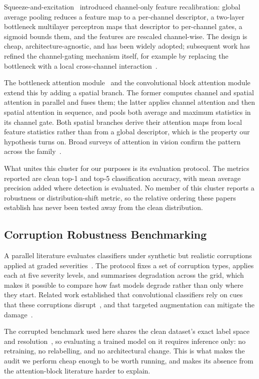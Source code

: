 Squeeze-and-excitation~\cite{hu2018squeeze} introduced channel-only feature
recalibration: global average pooling reduces a feature map to a per-channel
descriptor, a two-layer bottleneck multilayer perceptron maps that descriptor
to per-channel gates, a sigmoid bounds them, and the features are rescaled
channel-wise. The design is cheap, architecture-agnostic, and has been widely
adopted; subsequent work has refined the channel-gating mechanism itself, for
example by replacing the bottleneck with a local cross-channel
interaction~\cite{wang2020eca}.

The bottleneck attention module~\cite{park2018bam} and the convolutional block
attention module~\cite{woo2018cbam} extend this by adding a spatial branch. The
former computes channel and spatial attention in parallel and fuses them; the
latter applies channel attention and then spatial attention in sequence, and
pools both average and maximum statistics in its channel gate. Both spatial
branches derive their attention maps from local feature statistics rather than
from a global descriptor, which is the property our hypothesis turns on. Broad
surveys of attention in vision confirm the pattern across the
family~\cite{guo2022attention}.

What unites this cluster for our purposes is its evaluation protocol. The
metrics reported are clean top-1 and top-5 classification accuracy, with mean
average precision added where detection is evaluated. No member of this cluster
reports a robustness or distribution-shift metric, so the relative ordering
these papers establish has never been tested away from the clean distribution.

\subsection{Corruption Robustness Benchmarking}

A parallel literature evaluates classifiers under synthetic but realistic
corruptions applied at graded severities~\cite{hendrycks2019benchmarking}. The
protocol fixes a set of corruption types, applies each at five severity levels,
and summarises degradation across the grid, which makes it possible to compare
how fast models degrade rather than only where they start. Related work
established that convolutional classifiers rely on cues that these corruptions
disrupt~\cite{geirhos2019imagenet}, and that targeted augmentation can mitigate
the damage~\cite{hendrycks2020augmix}.

The corrupted benchmark used here shares the clean dataset's exact label space
and resolution~\cite{krizhevsky2009learning}, so evaluating a trained model on
it requires inference only: no retraining, no relabelling, and no architectural
change. This is what makes the audit we perform cheap enough to be worth
running, and makes its absence from the attention-block literature harder to
explain.

